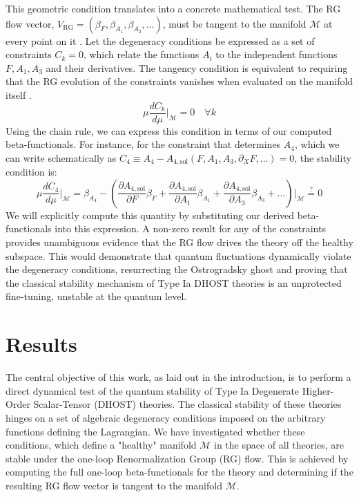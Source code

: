 \documentclass[twocolumn]{aastex631}
\begin{document}
This geometric condition translates into a concrete mathematical test. The RG flow vector, $V_{\text{RG}} = (\beta_F, \beta_{A_1}, \beta_{A_3}, \dots)$, must be tangent to the manifold $\mathcal{M}$ at every point on it \citep{bakas2007renormalizationgroupequationsgeometric,jackson2013geometricrgflow}. Let the degeneracy conditions be expressed as a set of constraints $C_k = 0$, which relate the functions $A_i$ to the independent functions $F, A_1, A_3$ and their derivatives. The tangency condition is equivalent to requiring that the RG evolution of the constraints vanishes when evaluated on the manifold itself \citep{jackson2013geometricrgflow}.
\begin{equation}\mu \frac{dC_k}{d\mu} \bigg|_{\mathcal{M}} = 0 \quad \forall k\end{equation}
Using the chain rule, we can express this condition in terms of our computed beta-functionals. For instance, for the constraint that determines $A_4$, which we can write schematically as $C_4 \equiv A_4 - A_{4,\text{sol}}(F, A_1, A_3, \partial_X F, \dots) = 0$, the stability condition is:
\begin{equation}\mu \frac{dC_4}{d\mu} \bigg|_{\mathcal{M}} = \beta_{A_4} - \left( \frac{\partial A_{4,\text{sol}}}{\partial F}\beta_F + \frac{\partial A_{4,\text{sol}}}{\partial A_1}\beta_{A_1} + \frac{\partial A_{4,\text{sol}}}{\partial A_3}\beta_{A_3} + \dots \right) \bigg|_{\mathcal{M}} \stackrel{?}{=} 0\end{equation}
We will explicitly compute this quantity by substituting our derived beta-functionals into this expression. A non-zero result for any of the constraints provides unambiguous evidence that the RG flow drives the theory off the healthy subspace. This would demonstrate that quantum fluctuations dynamically violate the degeneracy conditions, resurrecting the Ostrogradsky ghost and proving that the classical stability mechanism of Type Ia DHOST theories is an unprotected fine-tuning, unstable at the quantum level.

\section{Results}
\label{sec:results}
The central objective of this work, as laid out in the introduction, is to perform a direct dynamical test of the quantum stability of Type Ia Degenerate Higher-Order Scalar-Tensor (DHOST) theories. The classical stability of these theories hinges on a set of algebraic degeneracy conditions imposed on the arbitrary functions defining the Lagrangian. We have investigated whether these conditions, which define a "healthy" manifold $\mathcal{M}$ in the space of all theories, are stable under the one-loop Renormalization Group (RG) flow. This is achieved by computing the full one-loop beta-functionals for the theory and determining if the resulting RG flow vector is tangent to the manifold $\mathcal{M}$.
\end{document}
